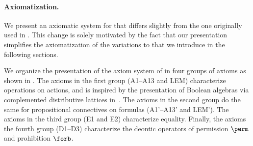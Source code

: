 
\paragraph{Axiomatization.}

We present an axiomatic system for \DAL that differs  slightly from the one originally used in \cite{Segerberg1982}. This change is solely motivated by the fact that our presentation simplifies the axiomatization of the variations to \DAL that we introduce in the following sections.

We organize the presentation of the axiom system of \DAL in four groups of axioms as shown in 
. %
The axioms in the first group (A1--A13 and LEM) characterize operations on actions, and is inspired by the presentation of Boolean algebras via complemented distributive lattices in~\cite{Esakia:2019,Halmos:2009}.
%
The axioms in the second group do the same for propositional connectives on formulas (A1'--A13' and LEM').
%
The axioms in the third group (E1 and E2) characterize equality.
%
Finally, the axioms the fourth group (D1--D3) characterize the deontic operators of permission $\perm$ and prohibition $\forb$.
%

